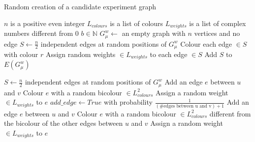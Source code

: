 \begin{enumerate}
\begin{definition}
            \begin{algorithm}
                \caption{Random creation of a candidate experiment graph}
                \label{alg:random_creation_candidate_experiment_graph}
                \begin{algorithmic}
                    \Require $n$ is a positive even integer
                    \Require $L_{colours}$ is a list of colours
                    \Require $L_{weights}$ is a list of complex numbers different from 0
                    \Require $b \in \mathbb{N}$
                    \State $G_\mu^w \gets$ an empty graph with $n$ vertices and no edge
                        \State $S \gets \frac{n}{2}$ independent edges at random positions of $G_\mu^w$
                        \State Colour each edge $\in S$ with colour $r$
                        \State Assign random weights $\in L_{weights}$ to each edge $\in S$
                        \State Add $S$ to $E(G_\mu^w)$
                    \EndFor

                        \State $S \gets \frac{n}{2}$ independent edges at random positions of $G_\mu^w$
                                \State Add an edge $e$ between $u$ and $v$
                                \State Colour $e$ with a random bicolour $\in L_{colours}^2$
                                \State Assign a random weight $\in L_{weights}$ to $e$
                            \Else
                                \State $add\_edge \gets True$ with probability $\frac{1}{(\mbox{\#edges between u and v}) + 1}$
                                    \State Add an edge $e$ between $u$ and $v$
                                    \State Colour $e$ with a random bicolour $\in L_{colours}^2$ different from the bicolour of the other edges between $u$ and $v$
                                    \State Assign a random weight $\in L_{weights}$ to $e$
                                \EndIf
                            \EndIf
                        \EndFor
                    \EndFor
                \end{algorithmic}
            \end{algorithm}
        \end{definition}


\end{enumerate}
